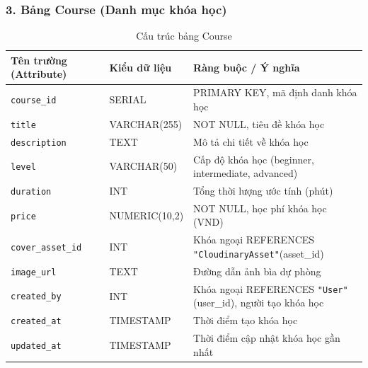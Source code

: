 \documentclass[../DoAn.tex]{subfiles}
\begin{document}
\subsubsection*{3. Bảng Course (Danh mục khóa học)}
\begin{table}[H]
\centering
\footnotesize
\renewcommand{\arraystretch}{1.2}
\begin{tabular}{|p{4.2cm}|p{3.2cm}|p{7.1cm}|}
\hline
\textbf{Tên trường (Attribute)} & \textbf{Kiểu dữ liệu} & \textbf{Ràng buộc / Ý nghĩa} \\
\hline
\texttt{course\_id} & SERIAL & PRIMARY KEY, mã định danh khóa học \\
\hline
\texttt{title} & VARCHAR(255) & NOT NULL, tiêu đề khóa học \\
\hline
\texttt{description} & TEXT & Mô tả chi tiết về khóa học \\
\hline
\texttt{level} & VARCHAR(50) & Cấp độ khóa học (beginner, intermediate, advanced) \\
\hline
\texttt{duration} & INT & Tổng thời lượng ước tính (phút) \\
\hline
\texttt{price} & NUMERIC(10,2) & NOT NULL, học phí khóa học (VND) \\
\hline
\texttt{cover\_asset\_id} & INT & Khóa ngoại REFERENCES \texttt{"CloudinaryAsset"}(asset\_id) \\
\hline
\texttt{image\_url} & TEXT & Đường dẫn ảnh bìa dự phòng \\
\hline
\texttt{created\_by} & INT & Khóa ngoại REFERENCES \texttt{"User"}(user\_id), người tạo khóa học \\
\hline
\texttt{created\_at} & TIMESTAMP & Thời điểm tạo khóa học \\
\hline
\texttt{updated\_at} & TIMESTAMP & Thời điểm cập nhật khóa học gần nhất \\
\hline
\end{tabular}
\caption{Cấu trúc bảng Course}
\label{tab:schema_course}
\end{table}
\end{document}
